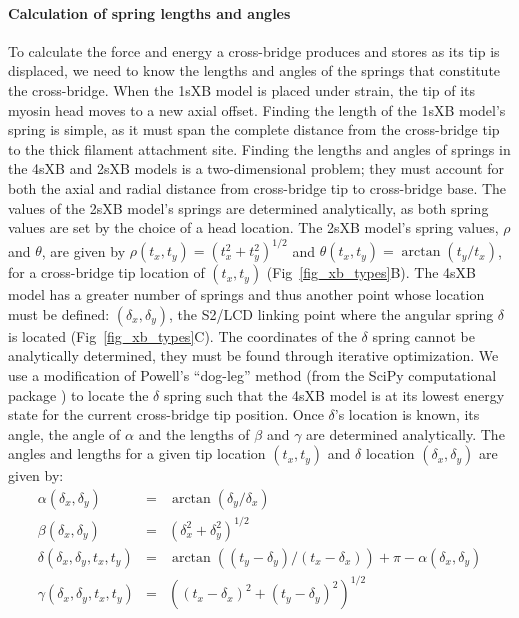 \documentclass[10pt]{article}
\newcommand{\citep}[1]{\cite{#1}} %
\begin{document}
\paragraph{Calculation of spring lengths and angles} %
To calculate the force and energy a cross-bridge produces and stores as its tip is displaced, we need to know the lengths and angles of the springs that constitute the cross-bridge. 
When the 1sXB model is placed under strain, the tip of its myosin head moves to a new axial offset. 
Finding the length of the 1sXB model's spring is simple, as it must span the complete distance from the cross-bridge tip to the thick filament attachment site. 
Finding the lengths and angles of springs in the 4sXB and 2sXB models is a two-dimensional problem; they must account for both the axial and radial distance from cross-bridge tip to cross-bridge base.
The values of the 2sXB model's springs are determined analytically, as both spring values are set by the choice of a head location. 
The 2sXB model's spring values, $\rho$ and $\theta$, are given by $\rho(t_x, t_y)=(t_x^2 + t_y^2)^{1/2}$ and $\theta(t_x, t_y)=\arctan(t_y/t_x)$, for a cross-bridge tip location of $(t_x, t_y)$ (Fig~\ref{fig_xb_types}B). 
The 4sXB model has a greater number of springs and thus another point whose location must be defined: $(\delta_x, \delta_y)$, the S2/LCD linking point where the angular spring $\delta$ is located (Fig~\ref{fig_xb_types}C). 
The coordinates of the $\delta$ spring cannot be analytically determined, they must be found through iterative optimization. 
We use a modification of Powell's ``dog-leg'' method (from the SciPy computational package \citep{SciPy}) to locate the $\delta$ spring such that the 4sXB model is at its lowest energy state for the current cross-bridge tip position.
Once $\delta$'s location is known, its angle, the angle of $\alpha$ and the lengths of $\beta$ and $\gamma$ are determined analytically.
The angles and lengths for a given tip location $(t_x, t_y)$ and $\delta$ location $(\delta_x, \delta_y)$ are given by:
\begin{eqnarray*}
\label{4sXB_spring_values}
\alpha(\delta_x, \delta_y) &=& \arctan(\delta_y/\delta_x) \\
\beta(\delta_x, \delta_y) &=& (\delta_x^2 + \delta_y^2)^{1/2} \\
\delta(\delta_x, \delta_y, t_x, t_y) &=& \arctan((t_y-\delta_y)/(t_x-\delta_x)) + \pi - \alpha(\delta_x, \delta_y) \\
\gamma(\delta_x, \delta_y, t_x, t_y) &=& ((t_x-\delta_x)^2 + (t_y-\delta_y)^2)^{1/2} 
\end{eqnarray*}
\end{document}
